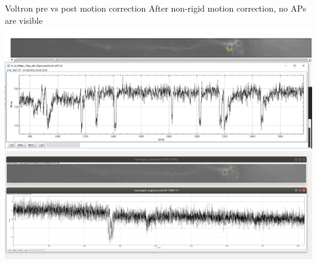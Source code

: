 \begin{frame}{ Voltron pre vs post motion correction }{ After non-rigid motion correction, no APs are visible}
    \includegraphics[width=\textwidth]{media/voltron_example_trace}
    \includegraphics[width=\textwidth]{media/voltron_nonrigid}
\end{frame}{}


